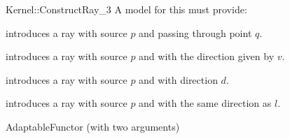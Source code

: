\begin{ccRefFunctionObjectConcept}{Kernel::ConstructRay_3}
A model for this must provide:


            {introduces a ray  
             with source $p$ and passing through point $q$.}

            {introduces a ray with source $p$ and with 
             the direction given by $v$.}

            {introduces a ray with source $p$ and with 
             direction $d$.}

            {introduces a ray with source $p$ and with 
             the same direction as $l$.}

\ccRefines
AdaptableFunctor (with two arguments)

\ccSeeAlso
{}\\

\end{ccRefFunctionObjectConcept}
